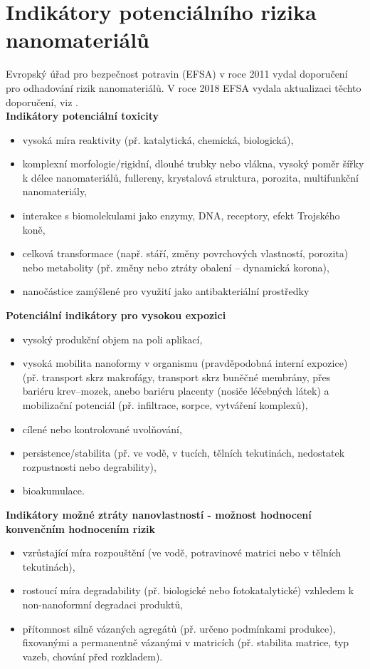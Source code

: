 \section{Indikátory potenciálního rizika nanomateriálů}

Evropský úřad pro bezpečnost potravin (EFSA) v roce 2011 vydal doporučení pro odhadování rizik nanomateriálů. \cite{filipova2012} V roce 2018 EFSA vydala aktualizaci těchto doporučení, viz \cite{efsa2018}.\\

\noindent \textbf{Indikátory potenciální toxicity}
    \begin{itemize}
        \item vysoká míra reaktivity (př. katalytická, chemická, biologická),
        \item komplexní morfologie/rigidní, dlouhé trubky nebo vlákna, vysoký poměr šířky k délce nanomateriálů, fullereny, krystalová struktura, porozita, multifunkční nanomateriály,
        \item interakce s biomolekulami jako enzymy, DNA, receptory, efekt Trojského koně,
        \item celková transformace (např. stáří, změny povrchových vlastností, porozita) nebo metabolity (př. změny nebo ztráty obalení – dynamická korona),
        \item nanočástice zamýšlené pro využití jako antibakteriální prostředky\\
    \end{itemize}
    
\noindent \textbf{Potenciální indikátory pro vysokou expozici}
    \begin{itemize}
        \item vysoký produkční objem na poli aplikací,
        \item vysoká mobilita nanoformy v organismu (pravděpodobná interní expozice) (př. transport skrz makrofágy, transport skrz buněčné membrány, přes bariéru krev–mozek, anebo bariéru placenty (nosiče léčebných látek) a mobilizační potenciál (př. infiltrace, sorpce, vytváření komplexů),
        \item cílené nebo kontrolované uvolňování,
        \item persistence/stabilita (př. ve vodě, v tucích, tělních tekutinách, nedostatek rozpustnosti nebo degrability),
        \item bioakumulace.\\
    \end{itemize}
    
\noindent \textbf{Indikátory možné ztráty nanovlastností - možnost hodnocení konvenčním hodnocením rizik}
    \begin{itemize}
        \item vzrůstající míra rozpouštění (ve vodě, potravinové matrici nebo v tělních tekutinách),
        \item rostoucí míra degradability (př. biologické nebo fotokatalytické) vzhledem k non-nanoformní degradaci produktů,
        \item přítomnost silně vázaných agregátů (př. určeno podmínkami produkce), fixovanými a permanentně vázanými v matricích (př. stabilita matrice, typ vazeb, chování před rozkladem).
    \end{itemize}